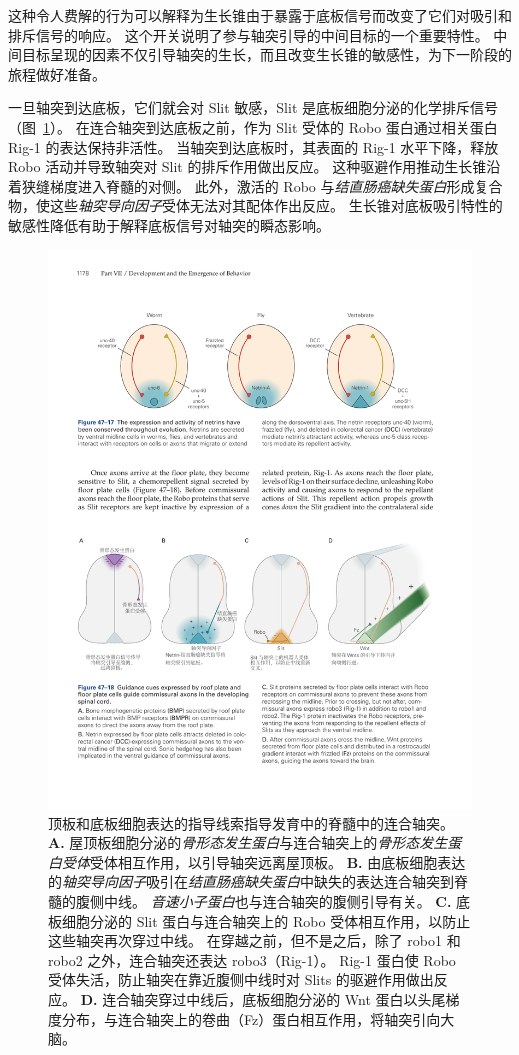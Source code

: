 这种令人费解的行为可以解释为生长锥由于暴露于底板信号而改变了它们对吸引和排斥信号的响应。
这个开关说明了参与轴突引导的中间目标的一个重要特性。
中间目标呈现的因素不仅引导轴突的生长，而且改变生长锥的敏感性，为下一阶段的旅程做好准备。


一旦轴突到达底板，它们就会对 Slit 敏感，Slit 是底板细胞分泌的化学排斥信号（图~\ref{fig:47_18}）。
在连合轴突到达底板之前，作为 Slit 受体的 Robo 蛋白通过相关蛋白 Rig-1 的表达保持非活性。
当轴突到达底板时，其表面的 Rig-1 水平下降，释放 Robo 活动并导致轴突对 Slit 的排斥作用做出反应。
这种驱避作用推动生长锥沿着狭缝梯度进入脊髓的对侧。
此外，激活的 Robo 与\textit{结直肠癌缺失蛋白}形成复合物，使这些\textit{轴突导向因子}受体无法对其配体作出反应。
生长锥对底板吸引特性的敏感性降低有助于解释底板信号对轴突的瞬态影响。


\begin{figure}[htbp]
	\centering
	\includegraphics[width=0.95\linewidth]{chap47/fig_47_18}
	\caption{顶板和底板细胞表达的指导线索指导发育中的脊髓中的连合轴突。
		\textbf{A.} 屋顶板细胞分泌的\textit{骨形态发生蛋白}与连合轴突上的\textit{骨形态发生蛋白受体}受体相互作用，以引导轴突远离屋顶板。
		\textbf{B.} 由底板细胞表达的\textit{轴突导向因子}吸引在\textit{结直肠癌缺失蛋白}中缺失的表达连合轴突到脊髓的腹侧中线。
		\textit{音速小子蛋白}也与连合轴突的腹侧引导有关。
		\textbf{C.} 底板细胞分泌的 Slit 蛋白与连合轴突上的 Robo 受体相互作用，以防止这些轴突再次穿过中线。
		在穿越之前，但不是之后，除了 robo1 和 robo2 之外，连合轴突还表达 robo3（Rig-1）。
		Rig-1 蛋白使 Robo 受体失活，防止轴突在靠近腹侧中线时对 Slits 的驱避作用做出反应。
		\textbf{D.} 连合轴突穿过中线后，底板细胞分泌的 Wnt 蛋白以头尾梯度分布，与连合轴突上的卷曲（Fz）蛋白相互作用，将轴突引向大脑。}
	\label{fig:47_18}
\end{figure}


